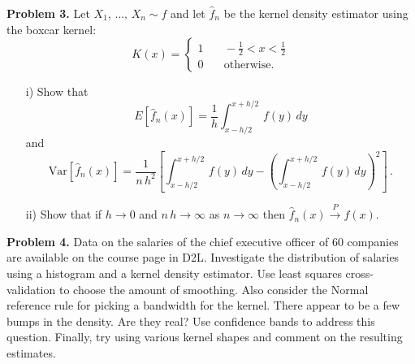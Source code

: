 \documentclass[11pt]{report}
\begin{document}
\noindent
{\bf Problem 3.} Let $X_1,\,\dots,\,X_n\sim f$ and let $\widehat{f}_n$ be the kernel density estimator using the boxcar kernel: 
$$K(x)=\begin{cases}
1 & \quad -\frac{1}{2}<x<\frac{1}{2}\\
0 & \quad \text{otherwise.} 
\end{cases}$$
\begin{itemize}
\item[i) ] Show that $$E\left[ \widehat{f}_n(x)\right]=\frac{1}{h}\int_{x-h/2}^{x+h/2}\,f(y)\,dy$$
and 
$$\text{Var}\left[\widehat{f}_n(x)\right]=\dfrac{1}{n\,h^2}\left[\int_{x-h/2}^{x+h/2}\,f(y)\,dy-\left( \int_{x-h/2}^{x+h/2}\,f(y)\,dy\right)^2 \right]\,.$$
\item[ii) ] Show that if $h\rightarrow 0$ and $n\,h\rightarrow \infty$ as $n\rightarrow \infty$ then $\widehat{f}_n(x)\xrightarrow{P} f(x)$. 
\end{itemize}

\noindent
{\bf Problem 4.} Data on the salaries of the chief executive officer of 60 companies are available on the course page in D2L. 
Investigate the distribution of salaries using a histogram and a kernel density estimator. Use least squares cross-validation to choose the amount of smoothing. Also consider the Normal reference rule for picking a bandwidth for the kernel. There appear to be a few bumps in the density. Are they real? Use confidence bands to address this question. Finally, try using various kernel shapes and comment on the resulting estimates. 
\end{document}
